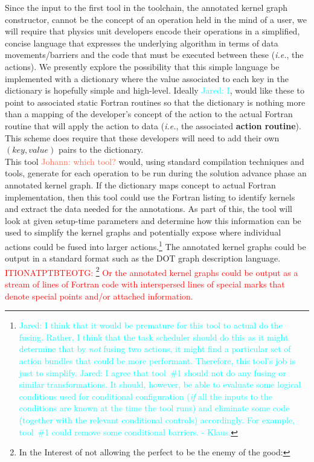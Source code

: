 \documentclass{article}
\newcommand{\ie}{\textit{i.e.}}   %
\newcommand{\Jared}[1]          {\textcolor{cyan}{Jared: #1}}
\newcommand{\JaredRfromKW}[1]   {\textcolor{cyan}{Jared: #1 - Klaus.}}
\newcommand{\Johann}[1]         {\textcolor{Tomato}{Johann: #1}}
\newcommand{\ITIONATPTBTEOTG}[1]{\textcolor{red}{ITIONATPTBTEOTG: #1}}
\begin{document}
Since the input to the first tool in the toolchain, the annotated kernel graph
constructor, cannot be the concept of an operation held in the mind of a user, we
will require that physics unit developers encode their operations in a
simplified, concise language that expresses the underlying algorithm in terms of
data movements/barriers and the code that must be executed between these (\ie,
the actions).  We presently explore the possibility that this simple language be
implemented with a dictionary where the value associated to each key in the
dictionary is hopefully simple and high-level.  Ideally \Jared{I}, would like
these to point to associated static Fortran routines so that the dictionary is
nothing more than a mapping of the developer's concept of the action to the
actual Fortran routine that will apply the action to data (\ie, the associated
\textbf{action routine}).  This scheme does require
that these developers will need to add their own $(key, value)$ pairs to the
dictionary.\\

This tool \Johann{which tool?} would, using standard compilation techniques and tools, generate for
each operation to be run during the solution advance phase an annotated kernel
graph.  If the dictionary maps concept to actual Fortran implementation, then
this tool could use the Fortran listing to identify kernels and extract the data needed for
the annotations.  As part of this, the tool will look at given setup-time
parameters and determine how this information can be used to simplify the kernel
graphs and potentially expose where individual actions could be fused into
larger actions.\footnote{\Jared{I think that it would be premature for this tool
to actual do the fusing.  Rather, I think that the task scheduler should do this
as it might determine that by \emph{not} fusing two actions, it might find a
particular set of action bundles that could be more performant.  Therefore, this
tool's job is just to simplify.}
\JaredRfromKW{I agree that tool~\#1 should not do any fusing or similar transformations.
It should, however, be able to evaluate some logical conditions used for conditional
configuration (\emph{if} all the inputs to the conditions are known at the time the tool runs)
and eliminate some code (together with the relevant conditional controls) accordingly.
For example, tool~\#1 could remove some conditional barriers.}}  The annotated kernel graphs could be output
in a standard format such as the DOT graph description language.
\ITIONATPTBTEOTG{\footnote{In the Interest of not allowing the perfect to be the enemy of the good:}
Or the annotated kernel graphs could be output
as a stream of lines of Fortran code with interspersed lines of special marks
that denote special points and/or attached information.}
\\
\end{document}
